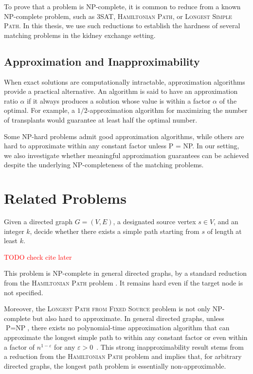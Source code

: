 To prove that a problem is NP-complete, it is common to reduce from a known NP-complete problem, such as \textsc{3SAT}, \textsc{Hamiltonian Path}, or \textsc{Longest Simple Path}. In this thesis, we use such reductions to establish the hardness of several matching problems in the kidney exchange setting.

\subsection*{Approximation and Inapproximability}

When exact solutions are computationally intractable, approximation algorithms provide a practical alternative. An algorithm is said to have an approximation ratio $\alpha$ if it always produces a solution whose value is within a factor $\alpha$ of the optimal. For example, a $1/2$-approximation algorithm for maximizing the number of transplants would guarantee at least half the optimal number.

Some NP-hard problems admit good approximation algorithms, while others are hard to approximate within any constant factor unless P = NP. In our setting, we also investigate whether meaningful approximation guarantees can be achieved despite the underlying NP-completeness of the matching problems.


\section{Related Problems}

\begin{problem}
\label{prob:longest_simple_path}
Given a directed graph $G = (V, E)$, a designated source vertex $s \in V$, and an integer $k$, decide whether there exists a simple path starting from $s$ of length at least $k$.
\end{problem}
\textcolor{red}{TODO check cite later}

This problem is NP-complete in general directed graphs, by a standard reduction from the \textsc{Hamiltonian Path} problem \cite{garey1979computers}. It remains hard even if the target node is not specified.

Moreover, the \textsc{Longest Path from Fixed Source} problem is not only NP-complete but also hard to approximate. In general directed graphs, unless $\text{P} = \text{NP}$, there exists no polynomial-time approximation algorithm that can approximate the longest simple path to within any constant factor or even within a factor of $n^{1 - \varepsilon}$ for any $\varepsilon > 0$~\cite{karger1997approximating, vazirani2001approximation}. This strong inapproximability result stems from a reduction from the \textsc{Hamiltonian Path} problem and implies that, for arbitrary directed graphs, the longest path problem is essentially non-approximable.


